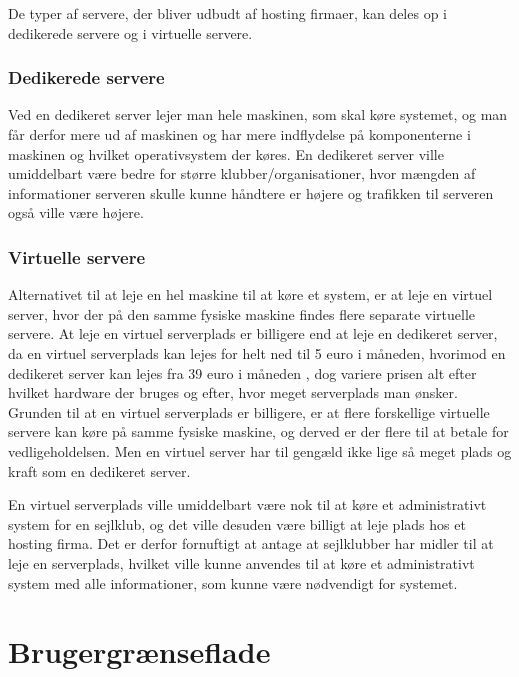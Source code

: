 De typer af servere, der bliver udbudt af hosting firmaer, kan deles op i dedikerede servere og i virtuelle servere.


\subsubsection*{Dedikerede servere}

Ved en dedikeret server lejer man hele maskinen, som skal køre systemet, og man får derfor mere ud af maskinen og har mere
indflydelse på komponenterne i maskinen og hvilket operativsystem der køres. En dedikeret server ville umiddelbart være
bedre for større klubber/organisationer, hvor mængden af informationer serveren skulle kunne håndtere er højere og
trafikken til serveren også ville være højere. \citep{server}


\subsubsection*{Virtuelle servere}

Alternativet til at leje en hel maskine til at køre et system, er at leje en virtuel server, hvor der på den samme
fysiske maskine findes flere separate virtuelle servere. At leje en virtuel serverplads er billigere end at leje en
dedikeret server, da en virtuel serverplads kan lejes for helt ned til 5 euro i måneden\citep{Virtuelserver}, hvorimod en
dedikeret server kan lejes fra 39 euro i måneden \citep{Dedikeretserver}, dog variere prisen alt efter hvilket hardware
der bruges og efter, hvor meget serverplads man ønsker. Grunden til at en virtuel serverplads er billigere, er at
flere forskellige virtuelle servere kan køre på samme fysiske maskine, og derved er der flere til at betale for
vedligeholdelsen. Men en virtuel server har til gengæld ikke lige så meget plads og kraft som en dedikeret
server.\citep{server}

En virtuel serverplads ville umiddelbart være nok til at køre et administrativt system for en sejlklub, og det ville
desuden være billigt at leje plads hos et hosting firma. Det er derfor fornuftigt at antage at sejlklubber har
midler til at leje en serverplads, hvilket ville kunne anvendes til at køre et administrativt system med alle
informationer, som kunne være nødvendigt for systemet.


\section{Brugergrænseflade}

